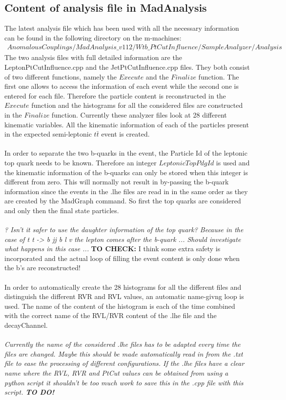 \documentclass[a4paper,12pt]{report}
\begin{document}
\subsection{Content of analysis file in MadAnalysis}
The latest analysis file which has been used with all the necessary information can be found in the following directory on the m-machines:
\begin{eqnarray*}
  AnomalousCouplings/MadAnalysis\_v112/Wtb\_PtCutInfluence/SampleAnalyzer/Analysis 
\end{eqnarray*}
The two analysis files with full detailed information are the LeptonPtCutInfluence.cpp and the JetPtCutInfluence.cpp files.
They both consist of two different functions, namely the $Execute$ and the $Finalize$ function. The first one allows to access the information of each event while the second one is entered for each file.
Therefore the particle content is reconstructed in the $Execute$ function and the histograms for all the considered files are constructed in the $Finalize$ function.
Currently these analyzer files look at 28 different kinematic variables. All the kinematic information of each of the particles present in the expected semi-leptonic $t\bar{t}$ event is created.\\
\\
In order to separate the two b-quarks in the event, the Particle Id of the leptonic top quark needs to be known. Therefore an integer $LeptonicTopPdgId$ is used and the kinematic information of the b-quarks can only be stored when this integer is different from zero.
This will normally not result in by-passing the b-quark information since the events in the .lhe files are read in in the same order as they are created by the MadGraph command. So first the top quarks are considered and only then the final state particles.\\
\\
\textit{? Isn't it safer to use the daughter information of the top quark? Because in the case of t t -> b jj b l v the lepton comes after the b-quark ... Should investigate what happens in this case ...} \textbf{TO CHECK: } I think some extra safety is incorporated and the actual loop of filling the event content is only done when the b's are reconstructed!\\
\\
In order to automatically create the 28 histograms for all the different files and distinguish the different RVR and RVL values, an automatic name-givng loop is used. The name of the content of the histogram is each of the time combined with the correct name of the RVL/RVR content of the .lhe file and the decayChannel.\\
\\
\textit{Currently the name of the considered .lhe files has to be adapted every time the files are changed. Maybe this should be made automatically read in from the .txt file to ease the processing of different configurations. If the .lhe files have a clear name where the RVL, RVR and PtCut values can be obtained from using a python script it shouldn't be too much work to save this in the .cpp file with this script. \textbf{TO DO!}}
\end{document}
